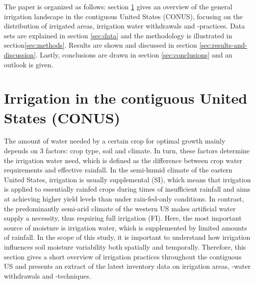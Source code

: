 \documentclass[hess, manuscript]{copernicus}
\begin{document}
The paper is organized as follows: section \ref{sec:background} gives an overview of the general irrigation landscape in the contiguous United States (CONUS), focusing on the distribution of irrigated areas, irrigation water withdrawals and -practices. Data sets are explained in section \ref{sec:data} and the methodology is illustrated in section\ref{sec:methods}. Results are shown and discussed in section \ref{sec:results-and-discussion}. Lastly, conclusions are drawn in section \ref{sec:conclusions} and an outlook is given.

\newpage
\section{Irrigation in the contiguous United States (CONUS)}
\label{sec:background}
The amount of water needed by a certain crop for optimal growth mainly depends on 3 factors: crop type, soil and climate. In turn, these factors determine the irrigation water need, which is defined as the difference between crop water requirements and effective rainfall. In the semi-humid climate of the eastern United States, irrigation is usually supplemental (SI), which means that irrigation is applied to essentially rainfed crops during times of insufficient rainfall and aims at achieving higher yield levels than under rain-fed-only conditions. In contrast, the predominantly semi-arid climate of the western US makes artificial water supply a necessity, thus requiring full irrigation (FI). Here, the most important source of moisture is irrigation water, which is supplemented by limited amounts of rainfall. In the scope of this study, it is important to understand how irrigation influences soil moisture variability both spatially and temporally. Therefore, this section gives a short overview of irrigation practices throughout the contiguous US and presents an extract of the latest inventory data on irrigation areas, -water withdrawals and -techniques.\\
\end{document}
